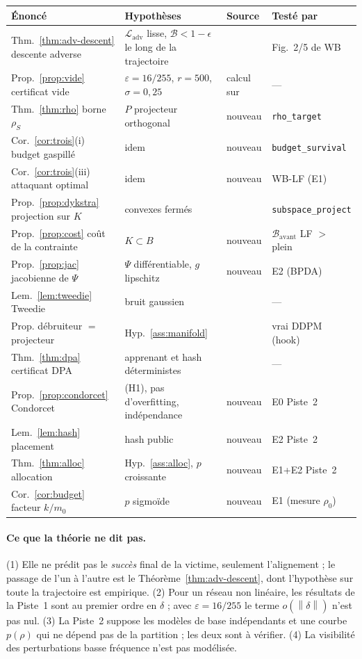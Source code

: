 \documentclass[11pt,a4paper]{article}
\theoremstyle{plain}
\theoremstyle{definition}
\theoremstyle{remark}
\newcommand{\Ladv}{\mathcal{L}_{\mathrm{adv}}}
\newcommand{\B}{\mathcal{B}}
\newcommand{\norm}[1]{\left\lVert #1 \right\rVert}
\begin{document}
\begin{center}
\small
\begin{tabular}{p{3.6cm}p{4.2cm}p{3.6cm}p{3.4cm}}
\toprule
Énoncé & Hypothèses & Source & Testé par\\
\midrule
Thm.~\ref{thm:adv-descent} descente adverse & $\Ladv$ lisse, $\B<1-\epsilon$ le long de la trajectoire & \cite{geiping2021} & Fig.~2/5 de WB\\
Prop.~\ref{prop:vide} certificat vide & $\varepsilon=16/255$, $r=500$, $\sigma=0{,}25$ & calcul sur \cite{hong2024} & ---\\
Thm.~\ref{thm:rho} borne $\rho_S$ & $P$ projecteur orthogonal & nouveau & \texttt{rho\_target}\\
Cor.~\ref{cor:trois}(i) budget gaspillé & idem & nouveau & \texttt{budget\_survival}\\
Cor.~\ref{cor:trois}(iii) attaquant optimal & idem & nouveau & WB-LF (E1)\\
Prop.~\ref{prop:dykstra} projection sur $K$ & convexes fermés & \cite{boyle1986,bauschke1996} & \texttt{subspace\_project}\\
Prop.~\ref{prop:cost} coût de la contrainte & $K\subset B$ & nouveau & $\B_{\text{avant}}$ LF $>$ plein\\
Prop.~\ref{prop:jac} jacobienne de $\Psi$ & $\Psi$ différentiable, $g$ lipschitz & nouveau & E2 (BPDA)\\
Lem.~\ref{lem:tweedie} Tweedie & bruit gaussien & \cite{miyasawa1961,efron2011} & ---\\
Prop. débruiteur $=$ projecteur & Hyp.~\ref{ass:manifold} & \cite{kadkhodaie2021} & vrai DDPM (hook)\\
Thm.~\ref{thm:dpa} certificat DPA & apprenant et hash déterministes & \cite{levine2021} & ---\\
Prop.~\ref{prop:condorcet} Condorcet & (H1), pas d'overfitting, indépendance & nouveau & E0 Piste~2\\
Lem.~\ref{lem:hash} placement & hash public & nouveau & E2 Piste~2\\
Thm.~\ref{thm:alloc} allocation & Hyp.~\ref{ass:alloc}, $p$ croissante & nouveau & E1+E2 Piste~2\\
Cor.~\ref{cor:budget} facteur $k/m_0$ & $p$ sigmoïde & nouveau & E1 (mesure $\rho_0$)\\
\bottomrule
\end{tabular}
\end{center}

\paragraph{Ce que la théorie ne dit pas.} (1) Elle ne prédit pas le \emph{succès} final de la
victime, seulement l'alignement ; le passage de l'un à l'autre est le Théorème~\ref{thm:adv-descent},
dont l'hypothèse sur toute la trajectoire est empirique. (2) Pour un réseau non linéaire, les
résultats de la Piste~1 sont au premier ordre en $\delta$ ; avec $\varepsilon=16/255$ le terme
$o(\norm\delta)$ n'est pas nul. (3) La Piste~2 suppose les modèles de base indépendants et une
courbe $p(\rho)$ qui ne dépend pas de la partition ; les deux sont à vérifier. (4) La visibilité
des perturbations basse fréquence n'est pas modélisée.
\end{document}
